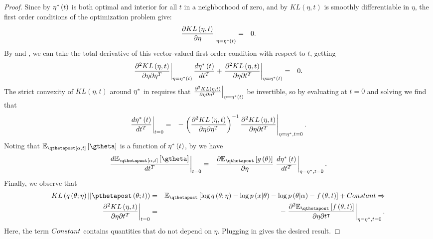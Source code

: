 \documentclass{article}\usepackage[]{graphicx}\usepackage[]{color}
\theoremstyle{plain}
\theoremstyle{definition}
\theoremstyle{plain}
\theoremstyle{plain}
\theoremstyle{plain}
\theoremstyle{plain}
\begin{document}
\begin{proof}
Since by  $\eta^{*}\left(t\right)$ is both optimal
and interior for all $t$ in a neighborhood of zero, and by 
$KL\left(\eta,t\right)$ is smoothly differentiable in $\eta$, the
first order conditions of the optimization problem 
give:
\begin{eqnarray*}
\left.\frac{\partial KL\left(\eta,t\right)}{\partial\eta}\right|_{\eta=\eta^{*}\left(t\right)} & = & 0.
\end{eqnarray*}
By  and , we
can take the total derivative of this vector-valued first order condition
with respect to $t$, getting
\begin{eqnarray*}
\left.\frac{\partial^{2}KL\left(\eta,t\right)}{\partial\eta\partial\eta^{T}}\right|_{\eta=\eta^{*}\left(t\right)}\frac{d\eta^{*}\left(t\right)}{dt^{T}}+\left.\frac{\partial^{2}KL\left(\eta,t\right)}{\partial\eta\partial t^{T}}\right|_{\eta=\eta^{*}\left(t\right)} & = & 0.
\end{eqnarray*}
The strict convexity of $KL\left(\eta,t\right)$ around $\eta^{*}$
in  requires that $\left.\frac{\partial^{2}KL\left(\eta,t\right)}{\partial\eta\partial\eta^{T}}\right|_{\eta=\eta^{*}\left(t\right)}$
be invertible, so by evaluating at $t=0$ and solving we find that
\begin{eqnarray*}
\left.\frac{d\eta^{*}\left(t\right)}{dt^{T}}\right|_{t=0} & = & -\left.\left(\frac{\partial^{2}KL\left(\eta,t\right)}{\partial\eta\partial\eta^{T}}\right)^{-1}\frac{\partial^{2}KL\left(\eta,t\right)}{\partial\eta\partial t^{T}}\right|_{\eta=\eta^{*},t=0}.
\end{eqnarray*}
Noting that $\mbe_{\qtthetapost}\left[\gtheta\right]$ is a function
of $\eta^{*}\left(t\right)$, by  we have 
\begin{eqnarray*}
\left.\frac{d\mbe_{\qtthetapost}\left[\gtheta\right]}{dt^{T}}\right|_{t=0} & = & \frac{\partial\mbeq\left[g\left(\theta\right)\right]}{\partial\eta}\left.\frac{d\etatopt}{dt^{T}}\right|_{\eta=\etaopt,t=0}.
\end{eqnarray*}
Finally, we observe that 
\begin{eqnarray*}
KL\left(q\left(\theta;\eta\right)||\pthetapost\left(\theta;t\right)\right) & = & \mbeq\left[\log q\left(\theta;\eta\right)-\log p\left(x\vert\theta\right)-\log p\left(\theta\vert\alpha\right)-f\left(\theta,t\right)\right]+\constant\Rightarrow\\
\left.\frac{\partial^{2}KL\left(\eta,t\right)}{\partial\eta\partial t^{T}}\right|_{t=0} & = & -\left.\frac{\partial^{2}\mbeq\left[f\left(\theta,t\right)\right]}{\partial\eta\partial t^{\trans}}\right|_{\eta=\etaopt,t=0}.
\end{eqnarray*}
Here, the term $Constant$ contains quantities that do not depend
on $\eta$. Plugging in gives the desired result.
\end{proof}
\end{document}
